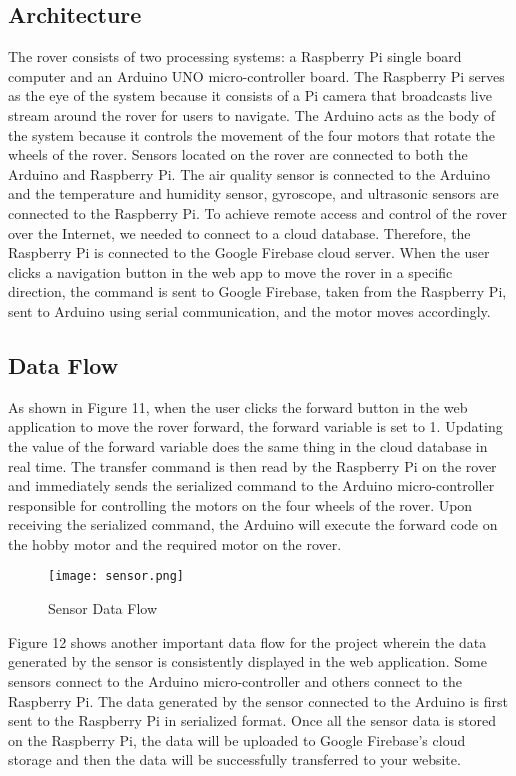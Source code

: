 \documentclass[conference,a4paper]{IEEEtran}
\begin{document}
\subsection{Architecture}
The rover consists of two processing systems: a Raspberry Pi single board computer and an Arduino UNO micro-controller board. The Raspberry Pi serves as the eye of the system because it consists of a Pi camera that broadcasts live stream around the rover for users to navigate. The Arduino acts as the body of the system because it controls the movement of the four motors that rotate the wheels of the rover. Sensors located on the rover are connected to both the Arduino and Raspberry Pi. The air quality sensor is connected to the Arduino and the temperature and humidity sensor, gyroscope, and  ultrasonic sensors are connected to the Raspberry Pi. To achieve remote access and control of the rover over the Internet, we needed to connect to a cloud database. Therefore, the Raspberry Pi is connected to the Google Firebase cloud server. When the user clicks a navigation button in the web app to move the rover  in a specific direction, the command is sent to Google Firebase, taken from the Raspberry Pi, sent to Arduino using serial communication, and the motor moves accordingly.


\subsection{Data Flow}
As shown in Figure 11, when the user clicks the forward button in the web application to move the rover forward, the forward variable is set to 1. Updating the value of the forward variable does the same thing in the cloud database in real time. The transfer command is then read by the Raspberry Pi on the rover and immediately sends the serialized command  to the Arduino micro-controller  responsible for controlling the motors on the four wheels of the rover. Upon receiving the serialized command, the Arduino will execute the forward code on the hobby motor and the required motor on the rover.

\begin{figure}[ht]
\centering
\texttt{[image: sensor.png]}
\caption{Sensor Data Flow}
\label{Fig: Data Flow}
\end{figure}

Figure 12 shows another important data flow for the project wherein the data generated by the sensor is consistently displayed in the web application. Some sensors connect to the Arduino micro-controller and others connect to the Raspberry Pi. The data  generated by the sensor connected to the Arduino is first sent  to the Raspberry Pi in serialized format. Once all the sensor data is stored on the Raspberry Pi, the data will be uploaded to Google Firebase's cloud storage and then the data will be successfully transferred to your website.
\end{document}
